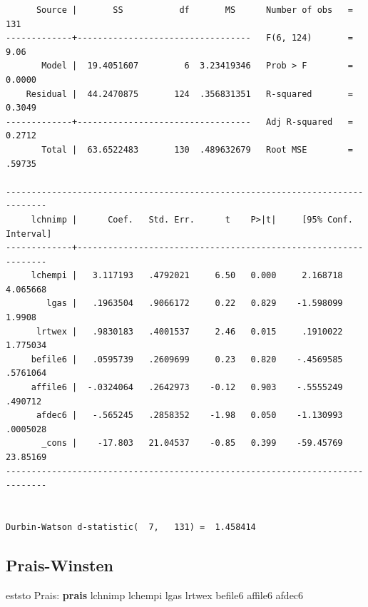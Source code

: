 \documentclass[
]{book}
\newenvironment{Shaded}{\begin{snugshade}}{\end{snugshade}}
\newcommand{\KeywordTok}[1]{\textcolor[rgb]{0.13,0.29,0.53}{\textbf{#1}}}
\newcommand{\NormalTok}[1]{#1}
\begin{document}
\begin{verbatim}
      Source |       SS           df       MS      Number of obs   =       131
-------------+----------------------------------   F(6, 124)       =      9.06
       Model |  19.4051607         6  3.23419346   Prob > F        =    0.0000
    Residual |  44.2470875       124  .356831351   R-squared       =    0.3049
-------------+----------------------------------   Adj R-squared   =    0.2712
       Total |  63.6522483       130  .489632679   Root MSE        =    .59735

------------------------------------------------------------------------------
     lchnimp |      Coef.   Std. Err.      t    P>|t|     [95% Conf. Interval]
-------------+----------------------------------------------------------------
     lchempi |   3.117193   .4792021     6.50   0.000     2.168718    4.065668
        lgas |   .1963504   .9066172     0.22   0.829    -1.598099      1.9908
      lrtwex |   .9830183   .4001537     2.46   0.015     .1910022    1.775034
     befile6 |   .0595739   .2609699     0.23   0.820    -.4569585    .5761064
     affile6 |  -.0324064   .2642973    -0.12   0.903    -.5555249     .490712
      afdec6 |   -.565245   .2858352    -1.98   0.050    -1.130993    .0005028
       _cons |    -17.803   21.04537    -0.85   0.399    -59.45769    23.85169
------------------------------------------------------------------------------


Durbin-Watson d-statistic(  7,   131) =  1.458414
\end{verbatim}

\subsection*{Prais-Winsten}\label{prais-winsten}

\begin{Shaded}
\begin{Highlighting}[]
\NormalTok{eststo Prais: }\KeywordTok{prais}\NormalTok{ lchnimp lchempi lgas lrtwex befile6 affile6 afdec6}
\end{Highlighting}
\end{Shaded}
\end{document}
